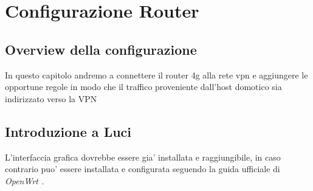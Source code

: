 
\chapter{Configurazione Router}

\section{Overview della configurazione}

In questo capitolo andremo a connettere il router 4g alla rete vpn e aggiungere le opportune regole in modo che il traffico proveniente dall'host domotico sia indirizzato verso la VPN

\section{Introduzione a Luci}

L'interfaccia grafica dovrebbe essere gia' installata e raggiungibile, in caso contrario puo' essere installata e configurata seguendo la guida ufficiale di \it{OpenWrt} \cite{install-luci}.

